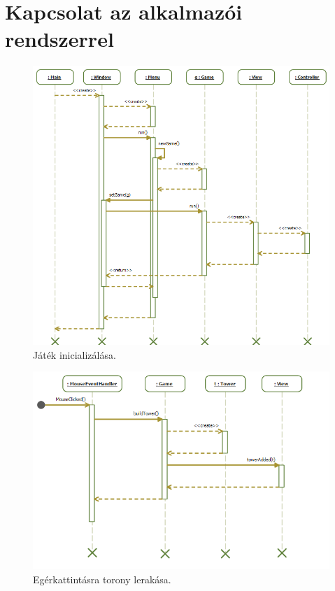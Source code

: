 \section{Kapcsolat az alkalmazói rendszerrel}

\begin{figure}[H]
\begin{center}
\includegraphics[width=18cm]{images/grafikaSeq/init.png}
\caption{Játék inicializálása.}
\label{fig:Graphic_initialize}
\end{center}
\end{figure}

\begin{figure}[H]
\begin{center}
\includegraphics[width=18cm]{images/grafikaSeq/mouseTower.png}
\caption{Egérkattintásra torony lerakása.}
\label{fig:Graphic_mouse_tower}
\end{center}
\end{figure}

